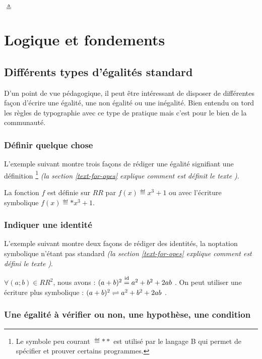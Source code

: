 \documentclass[12pt,a4paper]{article}
\newcommand\RR{RR}
\begin{document}
$\triangleq$
\section{Logique et fondements}

\subsection{Différents types d'égalités \og standard \fg}

D'un point de vue pédagogique, il peut être intéressant de disposer de différentes façon d'écrire une égalité, une non égalité ou une inégalité.
Bien entendu on tord les règles de typographie avec ce type de pratique mais c'est pour le bien de la communauté.

\subsubsection{Définir quelque chose}

L'exemple suivant montre trois façons de rédiger une égalité signifiant une définition
\footnote{
	Le symbole peu courant $\eqdef**$ est utilisé par le langage B qui permet de spécifier et prouver certains programmes.
}
\emph{(la section \ref{text-for-opes} explique comment est définit le texte \emph{\og \textopdef \fg})}.

\begin{tcblisting}{}
La fonction $f$ est définie sur $\RR$ par $f(x) \eqdef x^3 + 1$ ou avec l'écriture
symbolique $f(x) \eqdef* x^3 + 1$.
\end{tcblisting}


\subsubsection{Indiquer une identité}

L'exemple suivant montre deux façons de rédiger des identités, la noptation symbolique n'étant pas standard \emph{(la section \ref{text-for-opes} explique comment est défini le texte \emph{\og \textopid \fg})}.

\begin{tcblisting}{}
$\forall (a ; b) \in \RR^2$, nous avons : $(a + b)^2 \eqid a^2 + b^2 + 2 a b$ .
On peut utiliser une écriture plus symbolique : $(a + b)^2 \eqid* a^2 + b^2 + 2 a b$ .
\end{tcblisting}


\subsubsection{Une égalité à vérifier ou non, une hypothèse, une condition}
\end{document}
